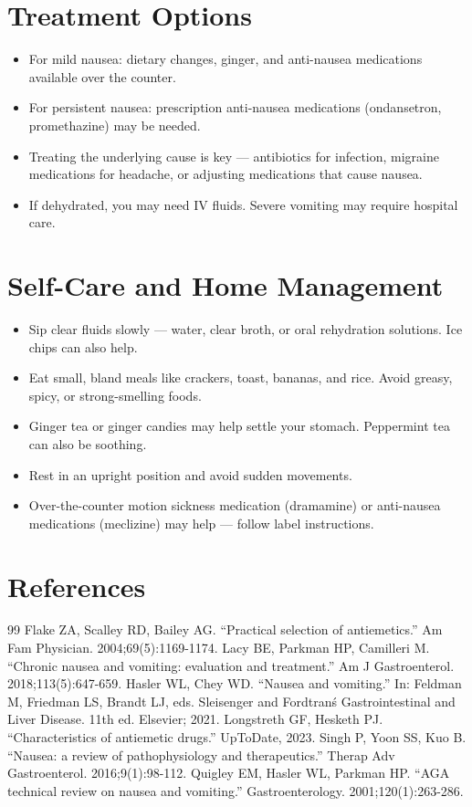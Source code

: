 \section*{Treatment Options}
\begin{itemize}
  \item For mild nausea: dietary changes, ginger, and anti-nausea medications available over the counter.
  \item For persistent nausea: prescription anti-nausea medications (ondansetron, promethazine) may be needed.
  \item Treating the underlying cause is key — antibiotics for infection, migraine medications for headache, or adjusting medications that cause nausea.
  \item If dehydrated, you may need IV fluids. Severe vomiting may require hospital care.
\end{itemize}

\section*{Self-Care and Home Management}
\begin{itemize}
  \item Sip clear fluids slowly — water, clear broth, or oral rehydration solutions. Ice chips can also help.
  \item Eat small, bland meals like crackers, toast, bananas, and rice. Avoid greasy, spicy, or strong-smelling foods.
  \item Ginger tea or ginger candies may help settle your stomach. Peppermint tea can also be soothing.
  \item Rest in an upright position and avoid sudden movements.
  \item Over-the-counter motion sickness medication (dramamine) or anti-nausea medications (meclizine) may help — follow label instructions.
\end{itemize}

\section*{References}
\begin{thebibliography}{99}
 Flake ZA, Scalley RD, Bailey AG. ``Practical selection of antiemetics.'' Am Fam Physician. 2004;69(5):1169-1174.
 Lacy BE, Parkman HP, Camilleri M. ``Chronic nausea and vomiting: evaluation and treatment.'' Am J Gastroenterol. 2018;113(5):647-659.
 Hasler WL, Chey WD. ``Nausea and vomiting.'' In: Feldman M, Friedman LS, Brandt LJ, eds. Sleisenger and Fordtran\'s Gastrointestinal and Liver Disease. 11th ed. Elsevier; 2021.
 Longstreth GF, Hesketh PJ. ``Characteristics of antiemetic drugs.'' UpToDate, 2023.
 Singh P, Yoon SS, Kuo B. ``Nausea: a review of pathophysiology and therapeutics.'' Therap Adv Gastroenterol. 2016;9(1):98-112.
 Quigley EM, Hasler WL, Parkman HP. ``AGA technical review on nausea and vomiting.'' Gastroenterology. 2001;120(1):263-286.
\end{thebibliography}
